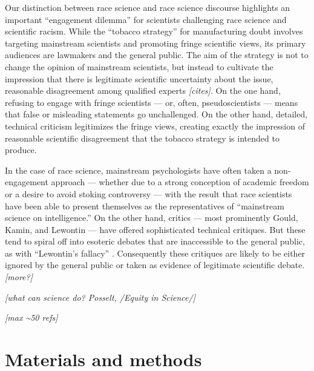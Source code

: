 \documentclass[12pt]{article}
\begin{document}
Our distinction between race science and race science discourse highlights an important ``engagement dilemma'' for scientists challenging race science and scientific racism. While the ``tobacco strategy'' for manufacturing doubt involves targeting mainstream scientists and promoting fringe scientific views, its primary audiences are lawmakers and the general public. The aim of the strategy is not to change the opinion of mainstream scientists, but instead to cultivate the impression that there is legitimate scientific uncertainty about the issue, reasonable disagreement among qualified experts \emph{{[}cites{]}}. On the one hand, refusing to engage with fringe scientists --- or, often, pseudoscientists \cite{BhakthavatsalamVirtueEpistemologicalApproach2021} --- means that false or misleading statements go unchallenged. On the other hand, detailed, technical criticism legitimizes the fringe views, creating exactly the impression of reasonable scientific disagreement that the tobacco strategy is intended to produce.

In the case of race science, mainstream psychologists have often taken a non-engagement approach --- whether due to a strong conception of academic freedom or a desire to avoid stoking controversy --- with the result that race scientists have been able to present themselves as the representatives of ``mainstream science on intelligence.'' On the other hand, critics --- most prominently Gould, Kamin, and Lewontin --- have offered sophisticated technical critiques. But these tend to spiral off into esoteric debates that are inaccessible to the general public, as with ``Lewontin's fallacy'' \cite{RosemanLewontinDidNot2021}. Consequently these critiques are likely to be either ignored by the general public or taken as evidence of legitimate scientific debate.\\
\emph{{[}more?{]}}

\emph{{[}what can science do? Posselt, /Equity in Science/{]}}

\emph{{[}max \textasciitilde50 refs{]}}

\clearpage
{}
\renewcommand*{\thepage}{\thesection.\arabic{page}}
\appendix
\renewcommand{\thesection}{S\arabic{section}}
\renewcommand\thefigure{\thesection.\arabic{figure}}    
\setcounter{figure}{0} 
\renewcommand\thetable{\thesection.\arabic{table}}    
\setcounter{table}{0}

\hypertarget{materials-and-methods}{%
\section{Materials and methods}\label{materials-and-methods}}
\end{document}
